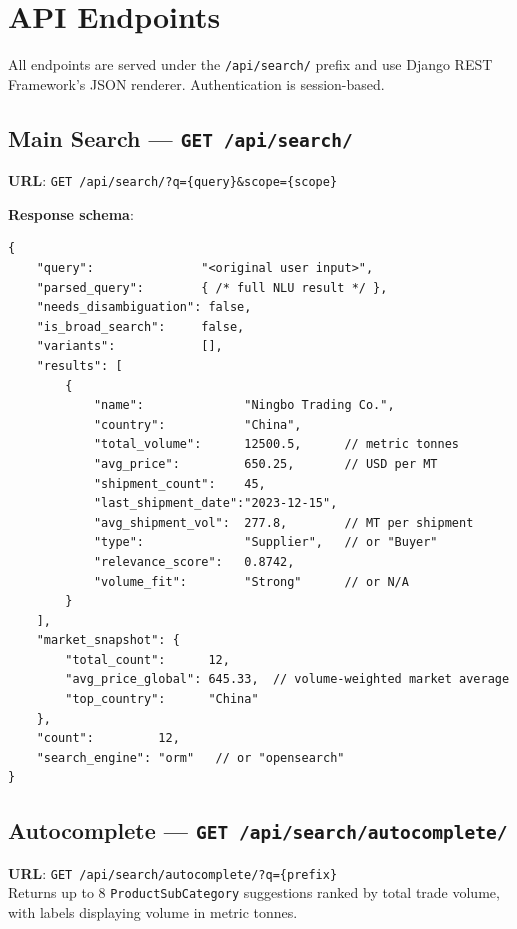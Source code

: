 \documentclass[12pt,a4paper]{article}
\begin{document}
\newpage
\section{API Endpoints}
\label{sec:api}

All endpoints are served under the \texttt{/api/search/} prefix and use Django REST
Framework's JSON renderer.  Authentication is session-based.

\subsection{Main Search --- \texttt{GET /api/search/}}

\begin{infobox}
\textbf{URL}: \texttt{GET /api/search/?q=\{query\}\&scope=\{scope\}}
\end{infobox}

\textbf{Response schema}:

\begin{lstlisting}[caption={Search response schema}]
{
    "query":               "<original user input>",
    "parsed_query":        { /* full NLU result */ },
    "needs_disambiguation": false,
    "is_broad_search":     false,
    "variants":            [],
    "results": [
        {
            "name":              "Ningbo Trading Co.",
            "country":           "China",
            "total_volume":      12500.5,      // metric tonnes
            "avg_price":         650.25,       // USD per MT
            "shipment_count":    45,
            "last_shipment_date":"2023-12-15",
            "avg_shipment_vol":  277.8,        // MT per shipment
            "type":              "Supplier",   // or "Buyer"
            "relevance_score":   0.8742,
            "volume_fit":        "Strong"      // or N/A
        }
    ],
    "market_snapshot": {
        "total_count":      12,
        "avg_price_global": 645.33,  // volume-weighted market average
        "top_country":      "China"
    },
    "count":         12,
    "search_engine": "orm"   // or "opensearch"
}
\end{lstlisting}

\subsection{Autocomplete --- \texttt{GET /api/search/autocomplete/}}

\begin{infobox}
\textbf{URL}: \texttt{GET /api/search/autocomplete/?q=\{prefix\}}\\
Returns up to 8 \texttt{ProductSubCategory} suggestions ranked by total trade volume,
with labels displaying volume in metric tonnes.
\end{infobox}
\end{document}
